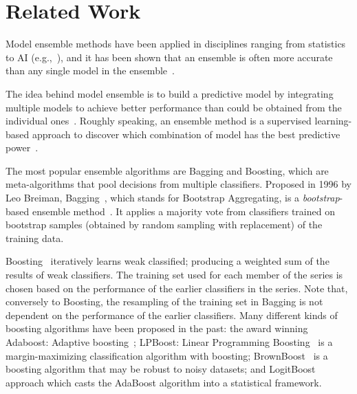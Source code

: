 \section{Related Work}
\label{sec-RelWork}
Model ensemble methods have been applied in disciplines ranging from statistics
to AI (e.g.,~\citep{breiman1996stacked,clemen1989combining,perrone1992soft,wolpert1992stacked}),
and it has been shown that an ensemble is often more accurate than any single
model in the ensemble~\citep{maclin2011popular}.

The idea behind model ensemble is to build a predictive model by integrating multiple models to achieve better performance than could be obtained from the individual ones~\citep{maclin2011popular,rokach2010ensemble}. Roughly speaking, an ensemble
method is a supervised learning-based approach to discover which combination of
model has the best predictive power~\cite{kuncheva2003measures}.

The most popular ensemble algorithms are Bagging and Boosting, which are meta-algorithms
that pool decisions from multiple classifiers.
%
Proposed in 1996 by Leo Breiman, Bagging~\citep{breiman1996stacked}, which stands for
Bootstrap Aggregating, is a \textit{bootstrap}-based ensemble method~\citep{efron1994introduction}.
It applies a majority vote from classifiers trained on bootstrap samples (obtained by
random sampling with replacement) of the training data.

Boosting~\citep{freund1996experiments,schapire1990strength} iteratively learns weak
classified; producing a weighted sum of the results of weak classifiers. The training set
used for each member of the series is chosen based on the performance of the earlier
classifiers in the series. Note that, conversely to Boosting, the resampling of the
training set in Bagging is not dependent on the performance of the earlier classifiers.
Many different kinds of boosting algorithms have been proposed in the past: the
award winning Adaboost: Adaptive boosting~\citep{freund1996experiments}; LPBoost:
Linear Programming Boosting~\citep{demiriz2002linear} is a margin-maximizing classification
algorithm with boosting; BrownBoost~\cite{freund2001adaptive} is a boosting algorithm
that may be robust to noisy datasets; and LogitBoost~\cite{friedman2000additive} approach
which casts the AdaBoost algorithm into a statistical framework.


